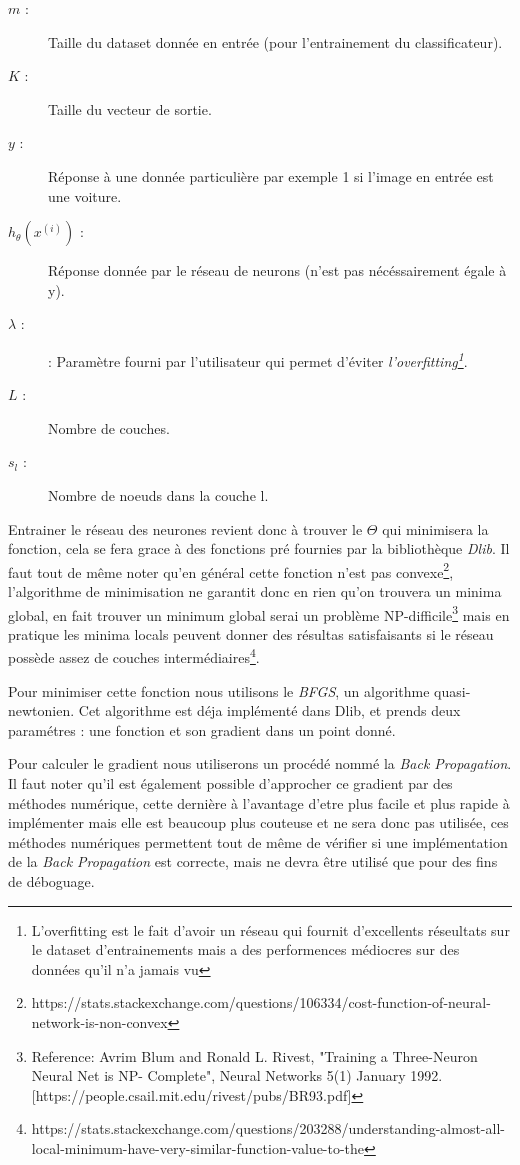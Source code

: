 \begin{description}

\item[$m$ : ] Taille du dataset donnée en entrée (pour l'entrainement du classificateur).
\item[$K$ : ] Taille du vecteur de sortie.
\item[$y$ : ] Réponse à une donnée particulière par exemple 1 si l'image en entrée est une voiture.
\item[$h_\theta(x^{(i)})$ : ] Réponse donnée par le réseau de neurons (n'est pas nécéssairement égale à y).
\item[$\lambda$ : ] : Paramètre fourni par l'utilisateur qui permet d'éviter \textit{l'overfitting\footnote{L'overfitting est le fait d'avoir un réseau qui fournit d'excellents réseultats sur le dataset d'entrainements mais a des performences médiocres sur des données qu'il n'a jamais vu}}.
\item[$L$ : ] Nombre de couches.
\item[$s_l$ : ] Nombre de noeuds dans la couche l.

\end{description}

Entrainer le réseau des neurones revient donc à trouver le $\Theta$ qui minimisera la fonction, cela se fera grace à des fonctions pré fournies par la bibliothèque \textit{Dlib}.
Il faut tout de même noter qu'en général cette fonction n'est pas convexe\footnote{https://stats.stackexchange.com/questions/106334/cost-function-of-neural-network-is-non-convex}, l'algorithme de minimisation ne garantit donc en rien qu'on trouvera un minima global, en fait trouver un minimum global serai un problème NP-difficile\footnote{Reference: Avrim Blum and Ronald L. Rivest, "Training a Three-Neuron Neural Net is NP- Complete", Neural Networks 5(1) January 1992. [https://people.csail.mit.edu/rivest/pubs/BR93.pdf]} mais en pratique les minima locals peuvent donner des résultas satisfaisants si le réseau possède assez de couches intermédiaires\footnote{https://stats.stackexchange.com/questions/203288/understanding-almost-all-local-minimum-have-very-similar-function-value-to-the}.

Pour minimiser cette fonction nous utilisons le \textit{BFGS}, un algorithme quasi-newtonien\cite{analyse}. Cet algorithme est déja implémenté dans Dlib, et prends deux paramétres : une fonction et son gradient dans un point donné.

Pour calculer le gradient nous utiliserons un procédé nommé la \textit{Back Propagation}. Il faut noter qu'il est également possible d'approcher ce gradient par des méthodes numérique, cette dernière à l'avantage d'etre plus facile et plus rapide à implémenter mais elle est beaucoup plus couteuse et ne sera donc pas utilisée, ces méthodes numériques permettent tout de même de vérifier si une implémentation de la \textit{Back Propagation} est correcte, mais ne devra être utilisé que pour des fins de déboguage.

